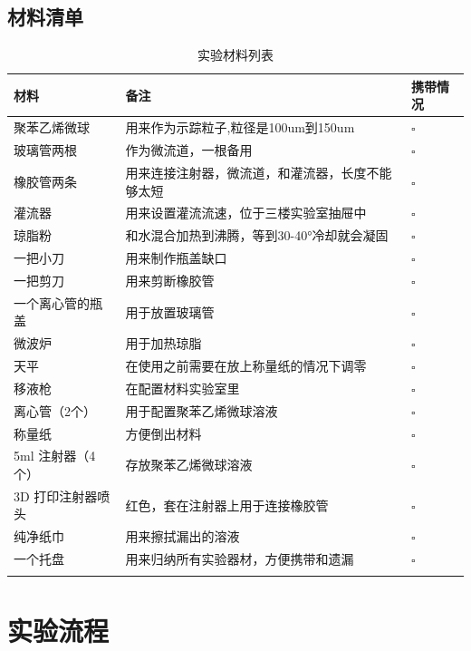 \documentclass[12pt]{article}
\begin{document}
\subsection{材料清单}
{
    \footnotesize
    \begin{longtable}{@{} p{5cm} p{10cm} p{2cm} @{}}
        \toprule
        \textbf{材料} & \textbf{备注} & \textbf{携带情况} \\ 
        \midrule
        聚苯乙烯微球 & 用来作为示踪粒子,粒径是100um到150um & $\square$ \\ 
        玻璃管两根 & 作为微流道，一根备用 & $\square$ \\ 
        橡胶管两条 & 用来连接注射器，微流道，和灌流器，长度不能够太短 & $\square$ \\ 
        灌流器 & 用来设置灌流流速，位于三楼实验室抽屉中 & $\square$ \\ 
        琼脂粉 & 和水混合加热到沸腾，等到30-40°冷却就会凝固 & $\square$ \\ 
        一把小刀 & 用来制作瓶盖缺口 & $\square$ \\ 
        一把剪刀 & 用来剪断橡胶管 & $\square$ \\ 
        一个离心管的瓶盖 & 用于放置玻璃管 & $\square$ \\ 
        微波炉 & 用于加热琼脂 & $\square$ \\ 
        天平 & 在使用之前需要在放上称量纸的情况下调零 & $\square$ \\ 
        移液枪 & 在配置材料实验室里 & $\square$\\ 
        离心管（2个） & 用于配置聚苯乙烯微球溶液 & $\square$ \\ 
        称量纸 & 方便倒出材料 & $\square$\\ 
        5ml 注射器（4个） & 存放聚苯乙烯微球溶液 & $\square$ \\ 
        3D 打印注射器喷头 & 红色，套在注射器上用于连接橡胶管 & $\square$ \\ 
        纯净纸巾 & 用来擦拭漏出的溶液 & $\square$ \\ 
        一个托盘 & 用来归纳所有实验器材，方便携带和遗漏 & $\square$ \\
        \bottomrule
        \caption{实验材料列表}
    \end{longtable}
    
}

\section{实验流程}
\end{document}
